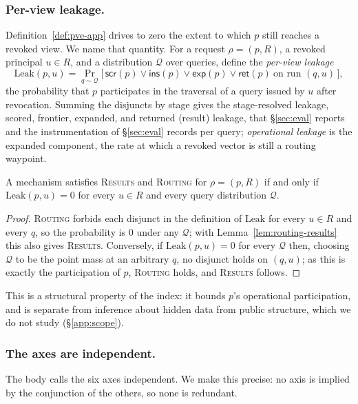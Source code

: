 \documentclass[sigconf, nonacm, review]{acmart}
\begin{document}
\subsubsection{Per-view leakage.}
\label{app:leakage}
Definition~\ref{def:pve-app} drives to zero the extent to which $p$ still
reaches a revoked view. We name that quantity. For a request $\rho=(p,R)$, a
revoked principal $u\in R$, and a distribution $\mathcal{Q}$ over queries,
define the \emph{per-view leakage}
\[
  \mathrm{Leak}(p,u)=\Pr_{q\sim\mathcal{Q}}\!\big[\,\mathsf{scr}(p)\lor
  \mathsf{ins}(p)\lor\mathsf{exp}(p)\lor\mathsf{ret}(p)\ \text{on run }(q,u)\,\big],
\]
the probability that $p$ participates in the traversal of a query issued by
$u$ after revocation. Summing the disjuncts by stage gives the stage-resolved
leakage, scored, frontier, expanded, and returned (result) leakage, that
\S\ref{sec:eval} reports and the instrumentation of
\S\ref{sec:eval} records per query; \emph{operational leakage} is the expanded
component, the rate at which a revoked vector is still a routing waypoint.

\begin{proposition}
\label{prop:leak-zero}
A mechanism satisfies \textsc{Results} and \textsc{Routing} for $\rho=(p,R)$
if and only if $\mathrm{Leak}(p,u)=0$ for every $u\in R$ and every query
distribution $\mathcal{Q}$.
\end{proposition}
\begin{proof}
\textsc{Routing} forbids each disjunct in the definition of
$\mathrm{Leak}$ for every $u\in R$ and every $q$, so the probability is $0$
under any $\mathcal{Q}$; with Lemma~\ref{lem:routing-results} this also gives
\textsc{Results}. Conversely, if $\mathrm{Leak}(p,u)=0$ for every $\mathcal{Q}$
then, choosing $\mathcal{Q}$ to be the point mass at an arbitrary $q$, no
disjunct holds on $(q,u)$; as this is exactly the participation of $p$,
\textsc{Routing} holds, and \textsc{Results} follows.
\end{proof}

This is a structural property of the index: it bounds $p$'s operational
participation, and is separate from inference about hidden data from public
structure, which we do not study (\S\ref{app:scope}).

\subsubsection{The axes are independent.}
\label{app:independence}
The body calls the six axes independent. We make this precise: no axis is
implied by the conjunction of the others, so none is redundant.
\end{document}
